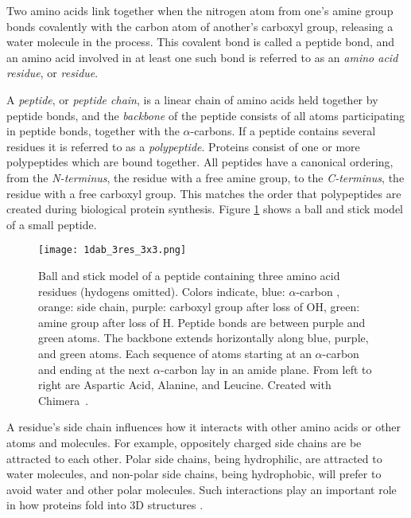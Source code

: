 Two amino acids link together when the nitrogen atom from one's amine group bonds covalently with the carbon atom of another's carboxyl group, releasing a water molecule in the process.
This covalent bond is called a peptide bond, and an amino acid involved in at least one such bond is referred to as an \textit{amino acid residue}, or \textit{residue}.

A \textit{peptide}, or \textit{peptide chain}, is a linear chain of amino acids held together by peptide bonds, and the \textit{backbone} of the peptide consists of all atoms participating in peptide bonds, together with the $\alpha$-carbons.
If a peptide contains several residues it is referred to as a \textit{polypeptide}.
Proteins consist of one or more polypeptides which are bound together.
All peptides have a canonical ordering, from the \textit{N-terminus}, the residue with a free amine group, to the \textit{C-terminus}, the residue with a free carboxyl group.
This matches the order that polypeptides are created during biological protein synthesis.
Figure \ref{fig:3res} shows a ball and stick model of a small peptide.

\begin{figure}
	\centering
	\texttt{[image: 1dab\_3res\_3x3.png]}
	\caption{Ball and stick model of a peptide containing three amino acid residues (hydogens omitted). Colors indicate, blue: $\alpha$-carbon , orange: side chain, purple: carboxyl group after loss of OH, green: amine group after loss of H. Peptide bonds are between purple and green atoms. The backbone extends horizontally along blue, purple, and green atoms. Each sequence of atoms starting at an $\alpha$-carbon and ending at the next $\alpha$-carbon lay in an amide plane. From left to right are Aspartic Acid, Alanine, and Leucine. Created with Chimera~\cite{pettersen2004}.}
	\label{fig:3res}
\end{figure}

A residue's side chain influences how it interacts with other amino acids or other atoms and molecules. 
For example, oppositely charged side chains are be attracted to each other.
Polar side chains, being hydrophilic, are attracted to water molecules, and non-polar side chains, being hydrophobic, will prefer to avoid water and other polar molecules.
Such interactions play an important role in how proteins fold into 3D structures \cite{scheeffink2003}.



